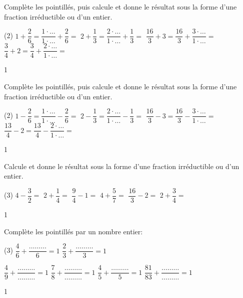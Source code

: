 \documentclass[a4paper,11pt]{report}
\begin{document}
\vfill

\begin{exo}
{Complète les pointillés, puis calcule et donne le résultat sous la forme d'une fraction irréductible ou d'un entier. 
\begin{tasks}(2)
\task $1+\dfrac{2}{6}= \dfrac{1\cdot\ldots}{1\cdot\ldots}+ \dfrac{2}{6}= $ 
\task $2+\dfrac{1}{3}=\dfrac{2\cdot\ldots}{1\cdot\ldots}+ \dfrac{1}{3}=$ 
\task $\dfrac{16}{3}+3=\dfrac{16}{3}+\dfrac{3\cdot\ldots}{1\cdot\ldots}=$
\task $\dfrac{3}{4}+2=\dfrac{3}{4}+\dfrac{2\cdot\ldots}{1\cdot\ldots}=$
\end{tasks}
}{1}
\end{exo}

\vfill

\begin{exo}
{Complète les pointillés, puis calcule et donne le résultat sous la forme d'une fraction irréductible ou d'un entier. 
\begin{tasks}(2)
\medskip\task $1-\dfrac{2}{6}= \dfrac{1\cdot\ldots}{1\cdot\ldots}- \dfrac{2}{6}=$ 
\medskip \task $2-\dfrac{1}{3}=\dfrac{2\cdot\ldots}{1\cdot\ldots}- \dfrac{1}{3}=$ 
\medskip \task $\dfrac{16}{3}-3= \dfrac{16}{3}-\dfrac{3\cdot\ldots}{1\cdot\ldots}=$ 
\medskip \task $\dfrac{13}{4}-2=\dfrac{13}{4}-\dfrac{2\cdot\ldots}{1\cdot\ldots}=$
\end{tasks}
}{1}
\end{exo}

\vfill

\newpage
\begin{exo}
{Calcule et donne le résultat sous la forme d'une fraction irréductible ou d'un entier. 
\begin{tasks}(3)
\task $4-\dfrac{3}{2}= $ 
 \task $2+\dfrac{1}{4}=$ 
 \task $\dfrac{9}{4}-1=$
 \task $4+\dfrac{5}{7}=$
 \task $\dfrac{16}{3}-2=$
 \task $2+\dfrac{3}{4}=$ 
\end{tasks}
}{1}
\end{exo}

\begin{exop}
{Complète les pointillés  par un nombre entier:	
\begin{tasks}(3)
\task $\dfrac{4}{6}+\dfrac{\ldots\ldots\ldots}{6}=1$
\task $\dfrac{2}{3}+\dfrac{\ldots\ldots\ldots}{3}=1$

\task $\dfrac{4}{9}+\dfrac{\ldots\ldots\ldots}{\ldots\ldots\ldots}=1$
\task $\dfrac{7}{8}+\dfrac{\ldots\ldots\ldots}{\ldots\ldots\ldots}=1$
\task $\dfrac{4}{5}+\dfrac{\ldots\ldots\ldots}{5}=1$
\task $\dfrac{81}{83}+\dfrac{\ldots\ldots\ldots}{\ldots\ldots\ldots}=1$
\end{tasks}
}{1}
\end{exop}
\end{document}
